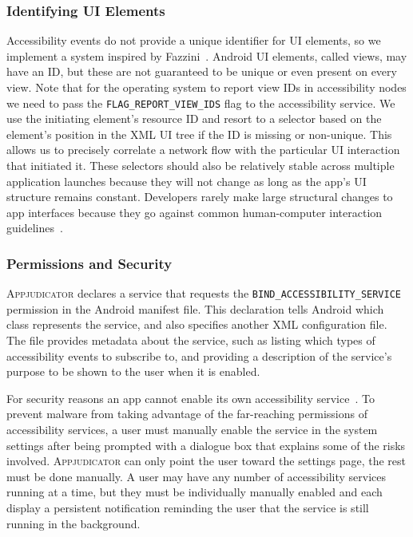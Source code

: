 \subsubsection{Identifying UI Elements}
\label{sec:identifying-ui-elements}

Accessibility events do not provide a unique identifier for UI elements, so we
implement a system inspired by Fazzini~\etal \cite{fazzini2017}. Android UI
elements, called views, may have an ID, but these are not guaranteed to be
unique or even present on every view. Note that for the operating system to
report view IDs in accessibility nodes we need to pass the
\texttt{FLAG\_REPORT\_VIEW\_IDS} flag to the accessibility service. We use the
initiating element's resource ID and resort to a selector based on the element's
position in the XML UI tree if the ID is missing or non-unique. This allows us
to precisely correlate a network flow with the particular UI interaction that
initiated it. These selectors should also be relatively stable across multiple
application launches because they will not change as long as the app's UI
structure remains constant.  Developers rarely make large structural changes to
app interfaces because they go against common human-computer interaction
guidelines~\cite{norman2013}.


\subsubsection{Permissions and Security}
\label{sec:accessibility-permissions}

\textsc{Appjudicator} declares a service that requests the
\texttt{BIND\_ACCESSIBILITY\_SERVICE} permission in the Android manifest file.
This declaration tells Android which class represents the service, and also
specifies another XML configuration file.  The file provides metadata about the
service, such as listing which types of accessibility events to subscribe to,
and providing a description of the service's purpose to be shown to the user
when it is enabled.

For security reasons an app cannot enable its own accessibility
service~\cite{kalysch2018}. To prevent malware from taking advantage of the
far-reaching permissions of accessibility services, a user must manually enable
the service in the system settings after being prompted with a dialogue box that
explains some of the risks involved. \textsc{Appjudicator} can only point the
user toward the settings page, the rest must be done manually. A user may have
any number of accessibility services running at a time, but they must be
individually manually enabled and each display a persistent notification
reminding the user that the service is still running in the background.

